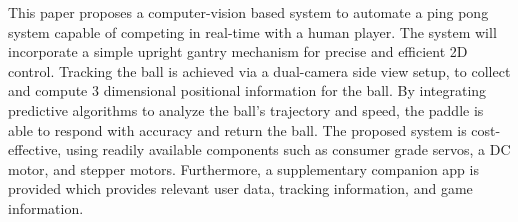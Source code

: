 This paper proposes a computer-vision based system to automate a ping pong system capable of competing in real-time with a human player. The system will incorporate a simple upright gantry mechanism for precise and efficient 2D control. Tracking the ball is achieved via a dual-camera side view setup, to collect and compute 3 dimensional positional information for the ball. By integrating predictive algorithms to analyze the ball's trajectory and speed, the paddle is able to respond with accuracy and return the ball. The proposed system is cost-effective, using readily available components such as consumer grade servos, a DC motor, and stepper motors. Furthermore, a supplementary companion app is provided which provides relevant user data, tracking information, and game information.